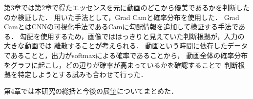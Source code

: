 第3章では第2章で得たエッセンスを元に動画のどこから優美であるかを判断したのか検証した．
用いた手法として，Grad Cam\cite{gradcam}と確率分布を使用した．
Grad CamとはCNNの可視化手法であるCam\cite{cam}に勾配情報を追加して検証する手法である．
勾配を使用するため，画像でははっきりと見えていた判断根拠が，入力の大きな動画では
離散することが考えられる．
動画という時間に依存したデータであることと，出力がsoftmaxによる確率であることから，
動画全体の確率分布をグラフに起こし，どの辺りが確率が高まっているかを確認することで
判断根拠を特定しようとする試みも合わせて行った．

第4章では本研究の総括と今後の展望についてまとめた．